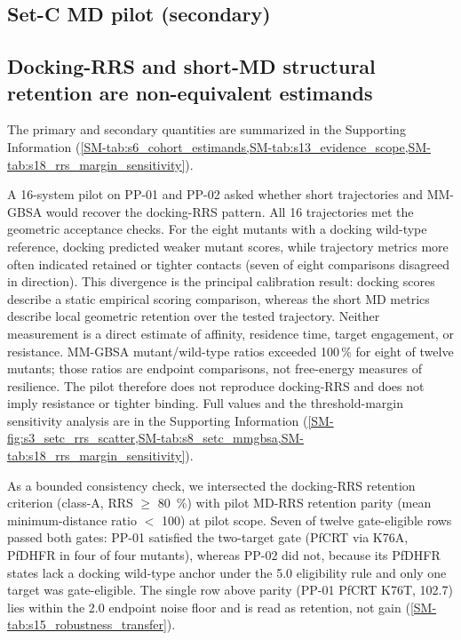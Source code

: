 \documentclass[journal=jcisd8,manuscript=article,layout=traditional]{achemso}
\begin{document}
\subsection{Set-C MD pilot (secondary)}
\label{sec:setc_pilot}

\subsection{Docking-RRS and short-MD structural retention are non-equivalent estimands}\label{sec:non_equiv_estimands}

The primary and secondary quantities are summarized in the Supporting Information (\cref{SM-tab:s6_cohort_estimands,SM-tab:s13_evidence_scope,SM-tab:s18_rrs_margin_sensitivity}).

A 16-system pilot on PP-01 and PP-02 asked whether short trajectories and MM-GBSA would recover the docking-RRS pattern. All 16 trajectories met the geometric acceptance checks. For the eight mutants with a docking wild-type reference, docking predicted weaker mutant scores, while trajectory metrics more often indicated retained or tighter contacts (seven of eight comparisons disagreed in direction). This divergence is the principal calibration result: docking scores describe a static empirical scoring comparison, whereas the short MD metrics describe local geometric retention over the tested trajectory. Neither measurement is a direct estimate of affinity, residence time, target engagement, or resistance. MM-GBSA mutant/wild-type ratios exceeded \num{100}\,\% for eight of twelve mutants; those ratios are endpoint comparisons, not free-energy measures of resilience. The pilot therefore does not reproduce docking-RRS and does not imply resistance or tighter binding. Full values and the threshold-margin sensitivity analysis are in the Supporting Information (\cref{SM-fig:s3_setc_rrs_scatter,SM-tab:s8_setc_mmgbsa,SM-tab:s18_rrs_margin_sensitivity}).

As a bounded consistency check, we intersected the docking-RRS retention criterion (class-A, RRS $\geq$ \qty{80}{\percent}) with pilot MD-RRS retention parity (mean minimum-distance ratio $<$ \num{100}) at pilot scope. Seven of twelve gate-eligible rows passed both gates: PP-01 satisfied the two-target gate (PfCRT via K76A, PfDHFR in four of four mutants), whereas PP-02 did not, because its PfDHFR states lack a docking wild-type anchor under the \qty{5.0}{\kcalmol} eligibility rule and only one target was gate-eligible. The single row above parity (PP-01 PfCRT K76T, \num{102.7}) lies within the \qty{2.0}{\kcalmol} endpoint noise floor and is read as retention, not gain (\cref{SM-tab:s15_robustness_transfer}).
\end{document}

